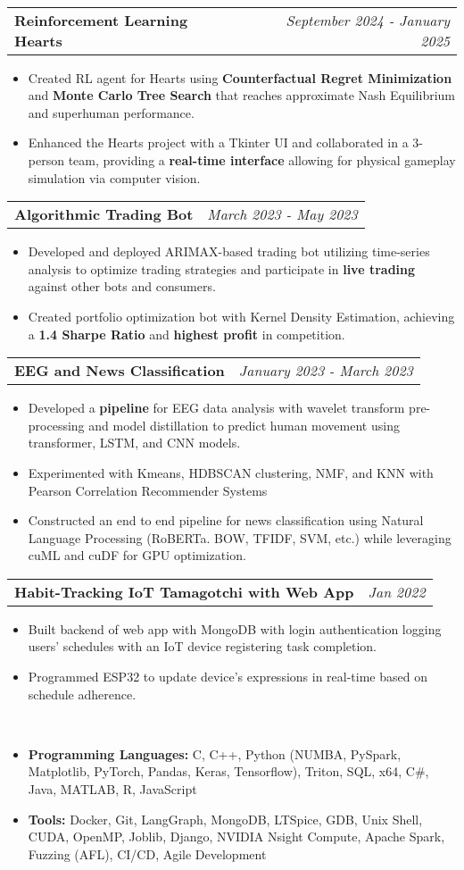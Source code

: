 \documentclass[letterpaper,11pt]{article}
\makeatletter
\newcommand{\resitem}[1]{\item #1 \vspace{-8pt}}
\newcommand{\resheading}[1]{\vspace{8pt}{\Large \textbf{#1}}\\\vspace{-8pt}\hrulefill}
\newcommand{\ressubheadingsmol}[2]{\vspace{1pt}
\begin{tabular*}{7.0in}{l@{\cftdotfill{\cftsecdotsep}\extracolsep{\fill}}r}
		\textbf{#1} & \textit{#2} \\
\end{tabular*}\vspace{-6pt}}
\makeatother
\begin{document}
\resheading{Projects}
\ressubheadingsmol{Reinforcement Learning Hearts}{September 2024 - January 2025}
\begin{itemize}
    \resitem{Created RL agent for Hearts using \textbf{Counterfactual Regret Minimization} and \textbf{Monte Carlo Tree Search} that reaches approximate Nash Equilibrium and superhuman performance.}
    \resitem{Enhanced the Hearts project with a Tkinter UI and collaborated in a 3-person team, providing a \textbf{real-time interface} allowing for physical gameplay simulation via computer vision.}
\end{itemize}

\ressubheadingsmol{Algorithmic Trading Bot}{March 2023 - May 2023}
\begin{itemize}
    \resitem{Developed and deployed ARIMAX-based trading bot utilizing time-series analysis to optimize trading strategies and participate in \textbf{live trading} against other bots and consumers.}
    \resitem{Created portfolio optimization bot with Kernel Density Estimation, achieving a \textbf{1.4 Sharpe Ratio} and \textbf{highest profit} in competition.}
\end{itemize}
\ressubheadingsmol{EEG and News Classification}{January 2023 - March 2023}

\begin{itemize}
    \resitem{Developed a \textbf{pipeline} for EEG data analysis with wavelet transform pre-processing and model distillation to predict human movement using transformer, LSTM, and CNN models.}
    \resitem{Experimented with Kmeans, HDBSCAN clustering, NMF, and KNN with Pearson Correlation
Recommender Systems}
    \resitem{Constructed an end to end pipeline for news classification using Natural Language Processing (RoBERTa. BOW, TFIDF, SVM, etc.) while leveraging cuML and cuDF for GPU optimization.}
\end{itemize}
\ressubheadingsmol{Habit-Tracking IoT Tamagotchi with Web App}{Jan 2022}
\begin{itemize}
\resitem{Built backend of web app with MongoDB  with login authentication logging users' schedules with an IoT device registering task completion.}
\resitem{Programmed ESP32 to update device's expressions in real-time based on schedule adherence.}
\end{itemize}

\resheading{Skills}
\begin{itemize}
\resitem{\textbf{Programming Languages:} C, C++, Python (NUMBA, PySpark, Matplotlib, PyTorch, Pandas, Keras, Tensorflow), Triton, SQL, x64, C\#, Java, MATLAB, R, JavaScript}
\resitem{\textbf{Tools:} Docker, Git, LangGraph, MongoDB, LTSpice, GDB, Unix Shell, CUDA, OpenMP, Joblib, Django, NVIDIA Nsight Compute, Apache Spark, Fuzzing (AFL), CI/CD, Agile Development}
\end{itemize}
\end{document}
